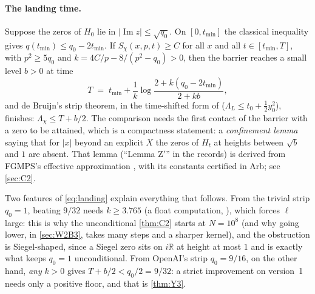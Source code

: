 \documentclass[11pt]{article}
\theoremstyle{definition}
\newcommand{\im}{\operatorname{Im}}
\newcommand{\R}{\mathbb{R}}
\newcommand{\Lc}{\Lambda}
\begin{document}
\paragraph{The landing time.} Suppose the zeros of $H_0$ lie in $|\im z| \le \sqrt{q_0}$. On $[0, t_{\min}]$ the classical inequality gives $q(t_{\min}) \le q_0 - 2t_{\min}$. If $S_\chi(x,p,t) \ge C$ for all $x$ and all $t \in [t_{\min}, T]$, with $p^2 \ge 5q_0$ and $k = 4C/p - 8/(p^2 - q_0) > 0$, then the barrier reaches a small level $b > 0$ at time
\begin{equation}\label{eq:landing}
T \;=\; t_{\min} + \frac1k\log\frac{2 + k(q_0 - 2t_{\min})}{2 + kb},
\end{equation}
and de Bruijn's strip theorem, in the time-shifted form of \cite[Theorem 2.6]{FGMPS2026} ($\Lc_L \le t_0 + \tfrac12 y_0^2$), finishes: $\Lc_\chi \le T + b/2$. The comparison needs the first contact of the barrier with a zero to be attained, which is a compactness statement: a \emph{confinement lemma} saying that for $|x|$ beyond an explicit $X$ the zeros of $H_t$ at heights between $\sqrt b$ and $1$ are absent. That lemma (``Lemma Z$'$'' in the records) is derived from FGMPS's effective approximation \cite[Theorem 4.3, Proposition 4.18]{FGMPS2026}, with its constants certified in Arb; see \cref{sec:C2}.

Two features of \eqref{eq:landing} explain everything that follows. From the trivial strip $q_0 = 1$, beating $9/32$ needs $k \ge 3.765$ (a float computation, \cite[Y3 memo \S2]{dq1records}), which forces $\ell$ large: this is why the unconditional \cref{thm:C2} starts at $N = 10^8$ (and why going lower, in \cref{sec:W2B3}, takes many steps and a sharper kernel), and the obstruction is Siegel-shaped, since a Siegel zero sits on $i\R$ at height at most $1$ and is exactly what keeps $q_0 = 1$ unconditional. From OpenAI's strip $q_0 = 9/16$, on the other hand, \emph{any} $k > 0$ gives $T + b/2 < q_0/2 = 9/32$: a strict improvement on version~1 needs only a positive floor, and that is \cref{thm:Y3}.
\end{document}
